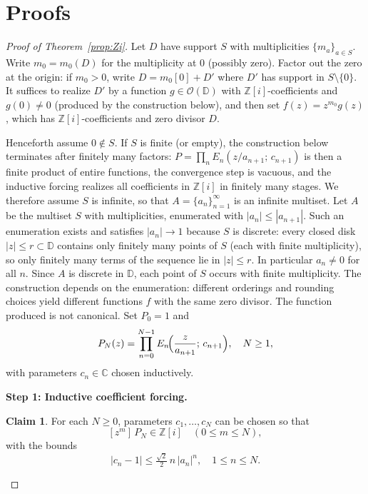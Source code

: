 \documentclass[12pt]{amsart}
\theoremstyle{definition}
\newtheorem{claim}[theorem]{Claim}
\newcommand{\D}{\mathbb{D}}
\newcommand{\Zi}{\mathbb{Z}[i]}
\newcommand{\C}{\mathbb{C}}
\newcommand{\abs}[1]{\left|#1\right|}
\newcommand{\OD}{\mathcal{O}(\D)}
\begin{document}
\section{Proofs}
\label{sec:proofs}

\begin{proof}[Proof of Theorem~\ref{prop:Zi}]
Let $D$ have support $S$ with multiplicities $\{m_a\}_{a \in S}$.
Write $m_0 = m_0(D)$ for the multiplicity at $0$ (possibly zero).
Factor out the zero at the origin: if $m_0 > 0$, write $D = m_0[0] + D'$
where $D'$ has support in $S \setminus \{0\}$.  It suffices to realize
$D'$ by a function $g \in \OD$ with $\Zi$-coefficients and $g(0) \neq 0$
(produced by the construction below), and then set $f(z) = z^{m_0}g(z)$,
which has $\Zi$-coefficients and zero divisor $D$.

Henceforth assume $0 \notin S$.  If $S$ is finite (or empty), the
construction below terminates after finitely many factors: $P = \prod_{n}
E_n(z/a_{n+1};\,c_{n+1})$ is then a finite product of entire functions,
the convergence step is vacuous, and the inductive forcing realizes all
coefficients in $\Zi$ in finitely many stages.  We therefore assume $S$
is infinite, so that $A = \{a_n\}_{n=1}^\infty$ is an infinite multiset.
Let $A$ be the
multiset $S$ with multiplicities, enumerated with $\abs{a_n} \leq
\abs{a_{n+1}}$.  Such an enumeration exists and satisfies $\abs{a_n} \to 1$
because $S$ is discrete: every closed disk $\abs{z} \leq r \subset \D$
contains only finitely many points of $S$ (each with finite
multiplicity), so only finitely many terms of the sequence lie in
$\abs{z} \leq r$.  In particular $a_n \neq 0$ for all $n$.
Since $A$ is discrete in $\D$, each point of $S$ occurs with finite
multiplicity.  The construction depends on the enumeration: different
orderings and rounding choices yield different functions $f$ with the
same zero divisor.  The function produced is not canonical.
Set $P_0 = 1$ and
\[
  P_{N}(z) = \prod_{n=0}^{N-1}
  E_n\!\Bigl(\frac{z}{a_{n+1}};\,c_{n+1}\Bigr), \quad N \geq 1,
\]
with parameters $c_n \in \C$ chosen inductively.

\medskip\noindent\textbf{Step 1: Inductive coefficient forcing.}

\begin{claim}
For each $N \geq 0$, parameters $c_1,\ldots,c_N$ can be chosen so that
\begin{equation}
\label{eq:indhyp}
  [z^m]\,P_N \in \Zi \quad (0 \leq m \leq N),
\end{equation}
with the bounds
\begin{equation}
\label{eq:cnbound}
  \abs{c_{n} - 1} \leq \tfrac{\sqrt{2}}{2}\,n\,\abs{a_{n}}^{n},
  \quad 1 \leq n \leq N.
\end{equation}
\end{claim}


\end{proof}
\end{document}

